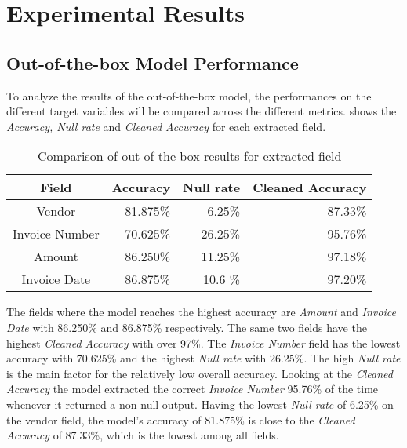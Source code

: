 \chapter{Experimental Results}

\section{Out-of-the-box Model Performance}

To analyze the results of the out-of-the-box model, the performances on the different target variables will be compared across the different metrics.  shows the \textit{Accuracy, Null rate} and \textit{Cleaned Accuracy} for each extracted field. 

\begin{table}[ht]   %
    \centering
    \footnotesize
    \begin{tabular}{c|rrr} %
        \toprule    %
        Field  & Accuracy  & Null rate & Cleaned Accuracy \\
        \midrule    %
        Vendor           & 81.875\%   &  6.25\%   & 87.33\% \\
        Invoice Number   & 70.625\%   & 26.25\%  & 95.76\%\\
        Amount           & 86.250\%   & 11.25\%  & 97.18\% \\
        Invoice Date     & 86.875\%   & 10.6 \%  & 97.20\% \\
        \bottomrule %
    \end{tabular}
    \caption{Comparison of out-of-the-box results for extracted field}
    \label{table:Field_Com}
\end{table}

The fields where the model reaches the highest accuracy are \textit{Amount} and \textit{Invoice Date} with 86.250\% and 86.875\% respectively. The same two fields have the highest \textit{Cleaned Accuracy} with over 97\%. The \textit{Invoice Number} field has the lowest accuracy with 70.625\% and the highest \textit{Null rate} with 26.25\%. The high \textit{Null rate} is the main factor for the relatively low overall accuracy. Looking at the \textit{Cleaned Accuracy} the model extracted the correct \textit{Invoice Number} 95.76\% of the time whenever it returned a non-null output. Having the lowest \textit{Null rate} of 6.25\% on the vendor field, the model's accuracy of 81.875\% is close to the \textit{Cleaned Accuracy} of 87.33\%, which is the lowest among all fields. 

